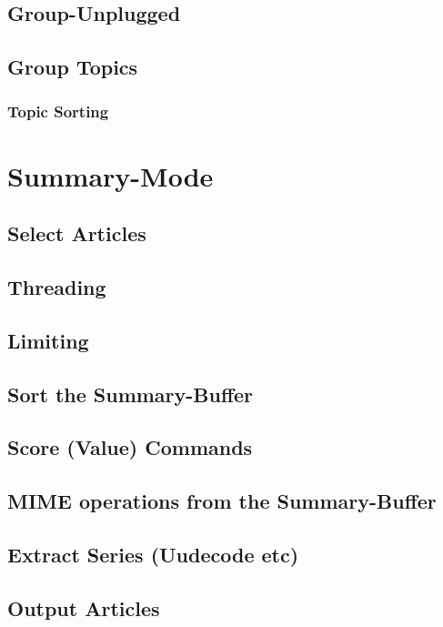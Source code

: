     \subsection*{Group-Unplugged}
    \GroupUnplugged
    \subsection*{Group Topics}
    \GroupTopicsGeneral
    \subsubsection*{Topic Sorting}
    \TopicSorting
\pagebreak
\section*{Summary-Mode}
\SummaryModeGeneral
    \subsection*{Select Articles}
    \SelectArticles
%
    \subsection*{Threading}
    \Threading
%
    \subsection*{Limiting}
    \Limiting
    \subsection*{Sort the Summary-Buffer}
    \SortSummary
    \subsection*{Score (Value) Commands}
    \Scoring
% 
    \subsection*{MIME operations from the Summary-Buffer}
    \MIMESummary
    \subsection*{Extract Series (Uudecode etc)}
    \ExtractSeries
    \subsection*{Output Articles}
    \OutputArticles
%
